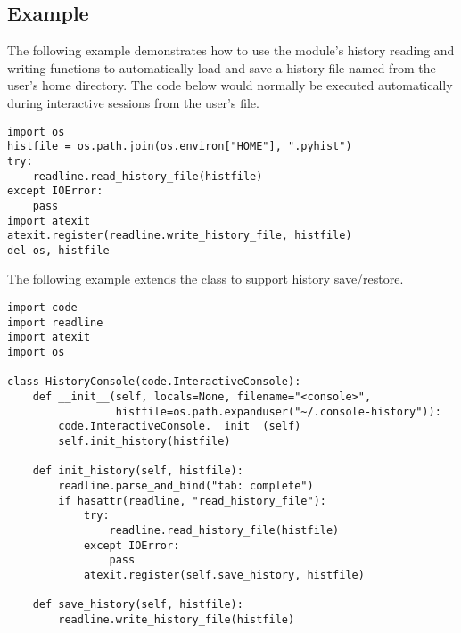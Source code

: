 \begin{seealso}
\end{seealso}


\subsection{Example \label{readline-example}}

The following example demonstrates how to use the
 module's history reading and writing functions to
automatically load and save a history file named  from
the user's home directory.  The code below would normally be executed
automatically during interactive sessions from the user's
 file.

\begin{verbatim}
import os
histfile = os.path.join(os.environ["HOME"], ".pyhist")
try:
    readline.read_history_file(histfile)
except IOError:
    pass
import atexit
atexit.register(readline.write_history_file, histfile)
del os, histfile
\end{verbatim}

The following example extends the  class to
support history save/restore.

\begin{verbatim}
import code
import readline
import atexit
import os

class HistoryConsole(code.InteractiveConsole):
    def __init__(self, locals=None, filename="<console>",
                 histfile=os.path.expanduser("~/.console-history")):
        code.InteractiveConsole.__init__(self)
        self.init_history(histfile)

    def init_history(self, histfile):
        readline.parse_and_bind("tab: complete")
        if hasattr(readline, "read_history_file"):
            try:
                readline.read_history_file(histfile)
            except IOError:
                pass
            atexit.register(self.save_history, histfile)

    def save_history(self, histfile):
        readline.write_history_file(histfile)
\end{verbatim}
